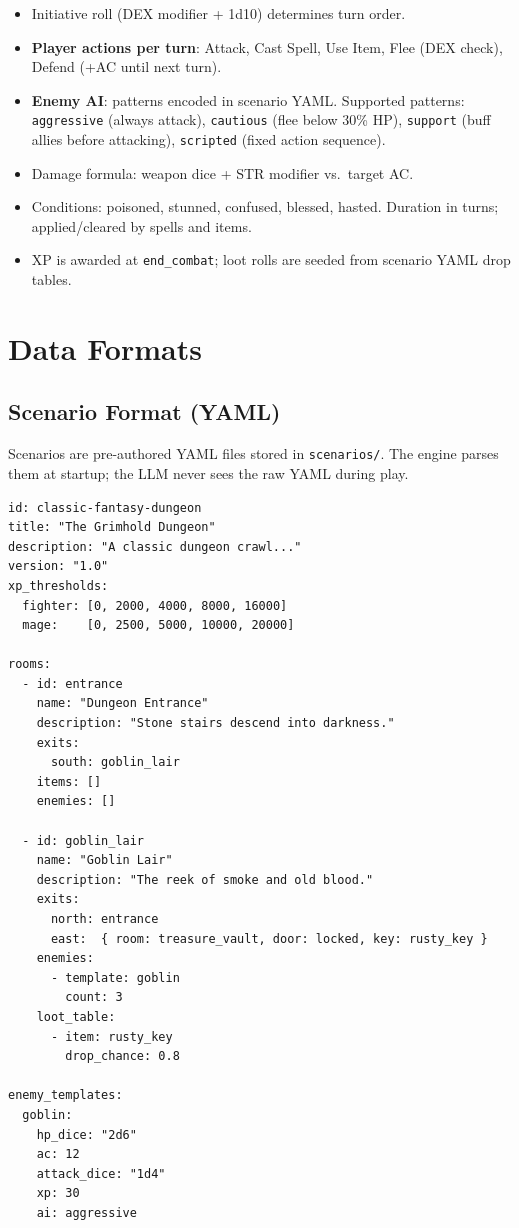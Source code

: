 \documentclass[a4paper,10pt]{article}
\begin{document}
\begin{itemize}
  \item Initiative roll (DEX modifier + 1d10) determines turn order.
  \item \textbf{Player actions per turn}: Attack, Cast Spell, Use
    Item, Flee (DEX check), Defend (+AC until next turn).
  \item \textbf{Enemy AI}: patterns encoded in scenario YAML.
    Supported patterns: \texttt{aggressive} (always attack),
    \texttt{cautious} (flee below 30\% HP), \texttt{support}
    (buff allies before attacking), \texttt{scripted} (fixed action
    sequence).
  \item Damage formula: weapon dice + STR modifier vs.\ target AC.
  \item Conditions: poisoned, stunned, confused, blessed, hasted.
    Duration in turns; applied/cleared by spells and items.
  \item XP is awarded at \texttt{end\_combat}; loot rolls are
    seeded from scenario YAML drop tables.
\end{itemize}

\section{Data Formats}

\subsection{Scenario Format (YAML)}

Scenarios are pre-authored YAML files stored in \texttt{scenarios/}.
The engine parses them at startup; the LLM never sees the raw YAML
during play.

\begin{lstlisting}[title={scenarios/classic-fantasy-dungeon.yaml (excerpt)}]
id: classic-fantasy-dungeon
title: "The Grimhold Dungeon"
description: "A classic dungeon crawl..."
version: "1.0"
xp_thresholds:
  fighter: [0, 2000, 4000, 8000, 16000]
  mage:    [0, 2500, 5000, 10000, 20000]

rooms:
  - id: entrance
    name: "Dungeon Entrance"
    description: "Stone stairs descend into darkness."
    exits:
      south: goblin_lair
    items: []
    enemies: []

  - id: goblin_lair
    name: "Goblin Lair"
    description: "The reek of smoke and old blood."
    exits:
      north: entrance
      east:  { room: treasure_vault, door: locked, key: rusty_key }
    enemies:
      - template: goblin
        count: 3
    loot_table:
      - item: rusty_key
        drop_chance: 0.8

enemy_templates:
  goblin:
    hp_dice: "2d6"
    ac: 12
    attack_dice: "1d4"
    xp: 30
    ai: aggressive
\end{lstlisting}
\end{document}
